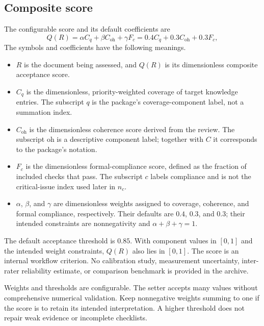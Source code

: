 \documentclass[12pt,a4paper]{article}
\newcommand{\code}[1]{\texttt{\detokenize{#1}}}
\begin{document}
\subsection{Composite score}
The configurable score and its default coefficients are
\begin{equation}
 Q(R)=\alpha C_q+\beta C_{\mathrm{oh}}+\gamma F_c
      =0.4C_q+0.3C_{\mathrm{oh}}+0.3F_c,
\end{equation}
The symbols and coefficients have the following meanings.
\begin{itemize}
\item $R$ is the document being assessed, and $Q(R)$ is its dimensionless composite acceptance score.
\item $C_q$ is the dimensionless, priority-weighted coverage of target knowledge entries. The subscript $q$ is the package's coverage-component label, not a summation index.
\item $C_{\mathrm{oh}}$ is the dimensionless coherence score derived from the review. The subscript $\mathrm{oh}$ is a descriptive component label; together with $C$ it corresponds to the package's \code{Coh} notation.
\item $F_c$ is the dimensionless formal-compliance score, defined as the fraction of included checks that pass. The subscript $c$ labels compliance and is not the critical-issue index used later in $n_c$.
\item $\alpha$, $\beta$, and $\gamma$ are dimensionless weights assigned to coverage, coherence, and formal compliance, respectively. Their defaults are $0.4$, $0.3$, and $0.3$; their intended constraints are nonnegativity and $\alpha+\beta+\gamma=1$.
\end{itemize}
The default acceptance threshold is $0.85$. With component values in $[0,1]$ and the intended weight constraints, $Q(R)$ also lies in $[0,1]$. The score is an internal workflow criterion. No calibration study, measurement uncertainty, inter-rater reliability estimate, or comparison benchmark is provided in the archive.

Weights and thresholds are configurable. The setter accepts many values without comprehensive numerical validation. Keep nonnegative weights summing to one if the score is to retain its intended interpretation. A higher threshold does not repair weak evidence or incomplete checklists.
\end{document}
